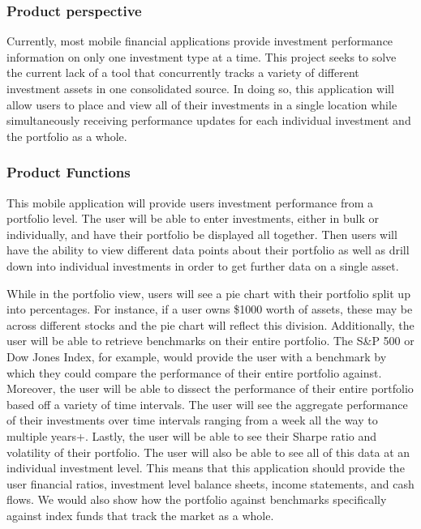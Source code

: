 \documentclass[onecolumn, draftclsnofoot,10pt, compsoc]{IEEEtran}
\begin{document}
\subsubsection{Product perspective}

Currently, most mobile financial applications provide investment performance information on only one investment type at a time. This project seeks to solve the current lack of a tool that concurrently tracks a variety of different investment assets in  one consolidated source. In doing so, this application will allow users to place and view all of their investments in a single location while simultaneously receiving performance updates for each individual investment and the portfolio as a whole.

\subsubsection{Product Functions}
This mobile application will provide users investment performance from a portfolio level. The user will be able to enter investments, either  in bulk or individually, and have their portfolio be displayed all together. Then users will have the ability to view different data points about their portfolio as well as drill down into individual investments in order to get further data on a single asset.

While in the portfolio view, users will see a pie chart with their portfolio split up into percentages. 
For instance, if a user owns \$1000 worth of assets, these may be across different stocks and the pie chart will reflect this division. Additionally, the user will be able to retrieve benchmarks on their entire portfolio. The S\&P 500 or Dow Jones Index, for example, would provide the user with a benchmark by which they could compare the performance of their entire portfolio against.  Moreover, the user will be able to dissect the performance of their entire portfolio based off a variety of time intervals. The user will see the aggregate 
performance of their investments over time intervals ranging from a week all the way to multiple years+. Lastly, the user will be able to see their Sharpe ratio and volatility of their portfolio. 
The user will also be able to see all of this data at an individual investment level. This means that this application should provide the user financial ratios, investment level balance sheets, income statements, and cash flows. We would also show how the portfolio against benchmarks specifically against index funds that track the market as a whole. 
\end{document}
